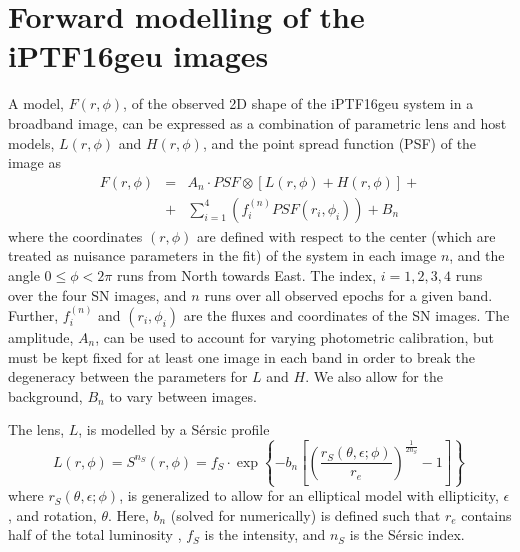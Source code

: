 \documentclass[a4paper,fleqn,usenatbib]{mnras}
\newcommand{\geu}{iPTF16geu\xspace}
\begin{document}







\appendix
\section{Forward modelling of the \geu images}
\label{sec:bgmodel}
A model,  $F(r,\phi)$, of the observed 2D shape of the \geu system in a broadband image, can be expressed as a 
combination of parametric lens and host models, $L(r,\phi)$ and $H(r,\phi)$, and the point spread function (PSF) of the 
image as
\begin{eqnarray*}
	F(r,\phi) & = & A_n\cdot PSF\otimes \left[L(r,\phi) + H(r,\phi)\right] +\\
	& + & \sum\limits_{i=1}^{4}\left( f_{i}^{(n)} PSF(r_i,\phi_i) \right)+ B_n
\end{eqnarray*}
where the coordinates $(r,\phi)$ are defined with respect to the center (which are treated as nuisance parameters in the fit)
of the system in each image $n$, and the angle $0 \leq \phi < 2\pi$ runs from North towards East.  The index, $i=1,2,3,4$ runs 
over the four SN images, and $n$ runs over all observed epochs for a given band.  Further, $f_{i}^{(n)}$ and $(r_i,\phi_i)$ are 
the fluxes and coordinates of the SN images.  The amplitude, $A_n$, can be used to account for varying photometric 
calibration, but must be kept fixed for at least one image in each band in order to break the degeneracy between the  
parameters for $L$ and $H$.  We also allow for the background, $B_n$ to vary between images. 

The lens, $L$, is modelled by a S\'ersic profile \citep{1963BAAA....6...41S}
\begin{equation}
	L(r,\phi) = S^{n_S}(r,\phi) = f_S\cdot \exp\left\{-b_n\left[\left(\frac{r_S(\theta,\epsilon;\phi)}{r_e}\right)^\frac{1}{2n_S} - 1\right]\right\}\,
	\label{eq:lens}
\end{equation}
where $r_S(\theta,\epsilon;\phi)$, is generalized to allow for an elliptical model with ellipticity, $\epsilon$, and rotation, $\theta$.  Here,
$b_n$ (solved for numerically) is defined such that $r_e$ contains half of the total luminosity , $f_S$ is the intensity, and $n_S$ is
the S\'ersic index.  
\end{document}
